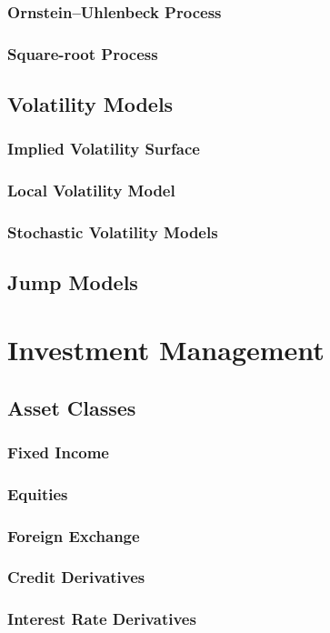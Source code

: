 \documentclass{book}
\begin{document}
\subsection{Ornstein--Uhlenbeck Process}
\subsection{Square-root Process}
\section{Volatility Models}
\subsection{Implied Volatility Surface}
\subsection{Local Volatility Model}
\subsection{Stochastic Volatility Models}
\section{Jump Models}



\chapter{Investment Management}
\section{Asset Classes}
\subsection{Fixed Income}
\subsection{Equities}
\subsection{Foreign Exchange}
\subsection{Credit Derivatives}
\subsection{Interest Rate Derivatives}
\end{document}
